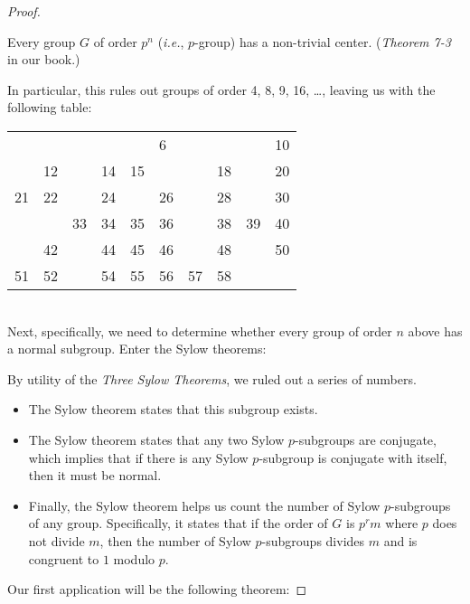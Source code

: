 \begin{proof}
    \begin{theorem}
    Every group $G$ of order $p^n$ (\textit{i.e.}, $p$-group) has a non-trivial center. (\textit{Theorem 7-3} in our book.)
    \end{theorem}

    In particular, this rules out groups of order 4, 8, 9, 16, …, leaving us with the following table:\\

    \begin{tabular}{llllllllll}
        \toprule
          &   &   &   &   & 6  &   &   &   & 10 \\ 
         & 12 &  & 14 & 15 &  &  & 18 &  & 20 \\
        21 & 22 &  & 24 &  & 26 &  & 28 &  & 30 \\
         &  & 33 & 34 & 35 & 36 &  & 38 & 39 & 40 \\
         & 42 &  & 44 & 45 & 46 &  & 48 &  & 50 \\
        51 & 52 &  & 54 & 55 & 56 & 57 & 58 &  &    \\ \bottomrule
    \end{tabular}\\

    Next, specifically, we need to determine whether every group of order $n$ above has a normal subgroup. Enter the Sylow theorems:

By utility of the \textit{Three Sylow Theorems}, we ruled out a series of numbers.
\begin{itemize}
    \item The  Sylow theorem states that this subgroup exists.
    \item The  Sylow theorem states that any two Sylow $p$-subgroups are conjugate, which implies that if there is any Sylow $p$-subgroup is conjugate with itself, then it must be normal. 
    \item Finally, the  Sylow theorem helps us count the number of Sylow $p$-subgroups of any group. Specifically, it states that if the order of $G$ is $p^{r}m$ where $p$ does not divide $m$, then the number of Sylow $p$-subgroups divides $m$ and is congruent to $1$ modulo $p$.
\end{itemize}


Our first application will be the following theorem:


\end{proof}
